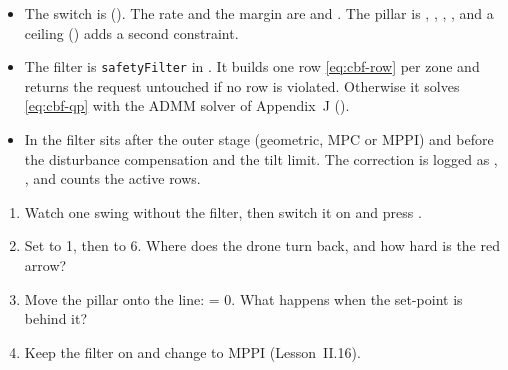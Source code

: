 \begin{inapp}
\begin{itemize}[leftmargin=1.2em]
  \item The switch is  (). The rate and the margin are  and . The pillar is , , , , and a ceiling () adds a second constraint.
  \item The filter is \texttt{safetyFilter} in . It builds one row \cref{eq:cbf-row} per zone and returns the request untouched if no row is violated. Otherwise it solves \cref{eq:cbf-qp} with the ADMM solver of Appendix~J ().
  \item In  the filter sits after the outer stage (geometric, MPC or MPPI) and before the disturbance compensation and the tilt limit. The correction is logged as , , and  counts the active rows.
\end{itemize}
\end{inapp}


\begin{trythis}
\begin{enumerate}
  \item Watch one swing without the filter, then switch it on and press .
  \item Set  to 1, then to 6. Where does the drone turn back, and how hard is the red arrow?
  \item Move the pillar onto the line:  = 0. What happens when the set-point is behind it?
  \item Keep the filter on and change  to MPPI (Lesson~II.16).
\end{enumerate}
\end{trythis}

